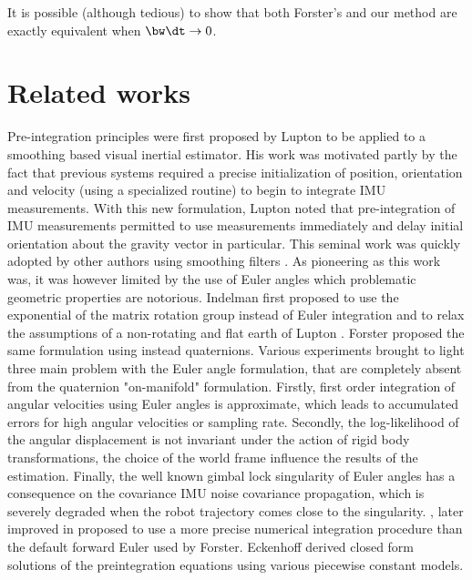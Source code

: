 It is possible (although tedious) to show that both Forster's and our method are exactly equivalent when $\bw\dt\to0$.




\section{Related works}

Pre-integration principles were first proposed by Lupton \cite{lupton-09} to be applied to a smoothing based visual inertial estimator. His work was motivated partly 
by the fact that previous systems required a precise initialization of position, orientation and velocity (using a specialized routine) to begin to integrate IMU measurements. 
With this new formulation, Lupton noted that pre-integration of IMU measurements permitted to use measurements immediately and delay initial orientation about the gravity
vector in particular. 
This seminal work was quickly adopted by other authors using smoothing filters \cite{carlone2014eliminating}. As pioneering as this work was, it was however 
limited by the use of Euler angles which problematic geometric properties are notorious. Indelman \cite{Indelman-2013-7768} first proposed to use the exponential of the 
matrix rotation group instead of Euler integration and to relax the assumptions of a non-rotating and flat earth of Lupton \cite{lupton-09}. Forster \cite{forster2015imu, forster2017-TRO}
proposed the same formulation using instead quaternions. Various experiments brought to light three main problem with the Euler angle formulation, that are completely absent 
from the quaternion "on-manifold" formulation. Firstly, first order integration of angular velocities using Euler angles is approximate, which leads to accumulated errors 
for high angular velocities or sampling rate.  Secondly, the log-likelihood of the angular displacement is not invariant under the action of rigid body transformations, 
\eg the choice of the world frame influence the results of the estimation. Finally, the well known gimbal lock singularity of Euler angles has a consequence 
on the covariance IMU noise covariance propagation, which is severely degraded when the robot trajectory comes close to the singularity. 
\cite{shen2015tightly}, later improved in \cite{qin2018vins} proposed to use a more precise numerical integration procedure than the default forward Euler used by Forster. 
Eckenhoff \cite{eckenhoff2019closed} derived closed form solutions of the preintegration equations using various piecewise constant models.

